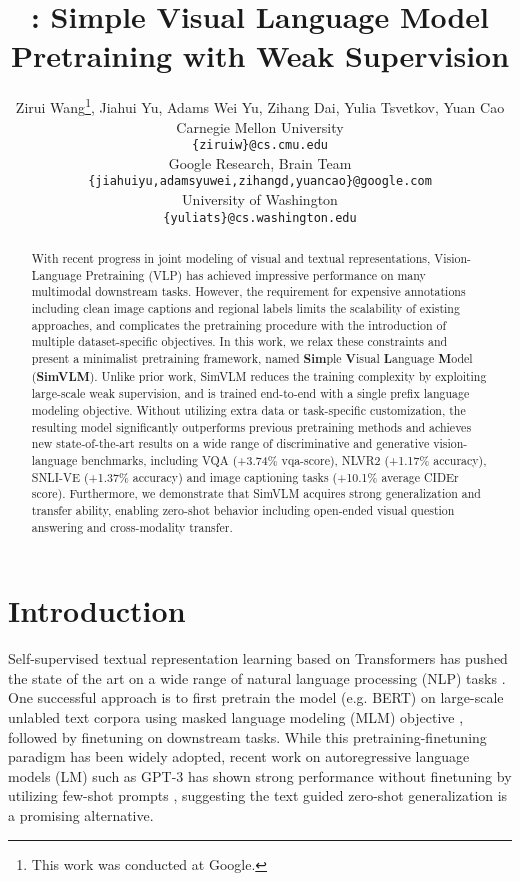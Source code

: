 \documentclass{article} \usepackage{iclr2022_conference,times}
\title{{\ours}: Simple Visual Language Model Pretraining with Weak Supervision}
\author{Zirui Wang\thanks{This work was conducted at Google.}, Jiahui Yu, Adams Wei Yu, Zihang Dai, Yulia Tsvetkov, Yuan Cao \\
Carnegie Mellon University\\ 
\texttt{\{ziruiw\}@cs.cmu.edu}\\
Google Research, Brain Team\\
\texttt{\{jiahuiyu,adamsyuwei,zihangd,yuancao\}@google.com} \\ 
University of Washington\\
\texttt{\{yuliats\}@cs.washington.edu}\\
}
\newcommand{\ours}{SimVLM}
\begin{document}
\maketitle

\begin{abstract}
With recent progress in joint modeling of visual and textual representations,
Vision-Language Pretraining (VLP) has achieved impressive performance on many multimodal downstream tasks. However, the requirement for expensive annotations including clean image captions and regional labels limits the scalability of existing approaches, and complicates the pretraining procedure with the introduction of multiple dataset-specific objectives.
In this work, we relax these constraints and present a minimalist pretraining framework, named \textbf{Sim}ple \textbf{V}isual \textbf{L}anguage \textbf{M}odel ({\bf\ours}).
Unlike prior work, {\ours} reduces the training complexity by exploiting large-scale weak supervision, and is trained end-to-end with a single prefix language modeling objective. Without utilizing extra data or task-specific customization, the resulting model significantly outperforms previous pretraining methods and achieves new state-of-the-art results on a wide range of discriminative and generative vision-language benchmarks, including VQA (+3.74\% vqa-score), NLVR2 (+1.17\% accuracy), SNLI-VE (+1.37\% accuracy) and image captioning tasks (+10.1\% average CIDEr score). Furthermore,
we demonstrate that {\ours} acquires strong generalization and transfer ability, enabling zero-shot behavior including open-ended visual question answering and cross-modality transfer.
\end{abstract}

\section{Introduction}\label{sec:intro}

Self-supervised textual representation learning \citep{devlin2018bert,radford2018improving,radford2019language,liu2019roberta,yang2019xlnet,raffel2019exploring,brown2020language}
based on Transformers \citep{vaswani2017attention}
has pushed the state of the art on a wide range of natural language processing (NLP) tasks \citep{rajpurkar2016squad,wang2018glue,sarlin2020superglue}.
One successful approach is to first pretrain the model (e.g. BERT) on large-scale unlabled text corpora using masked language modeling (MLM) objective  \citep{devlin2018bert},
followed by finetuning on downstream tasks.
While this pretraining-finetuning paradigm has been widely adopted,
recent work on autoregressive language models (LM) \citep{radford2019language,brown2020language} such as GPT-3  
has shown strong performance without finetuning by utilizing few-shot prompts \citep{liu2021pretrain},
suggesting the text guided zero-shot generalization is a promising alternative.
\end{document}
